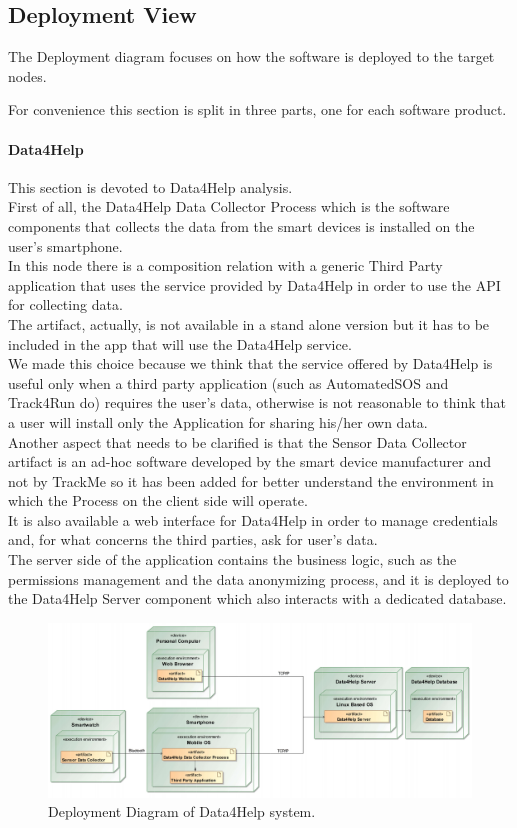 \documentclass[a4paper]{article}
\begin{document}
\subsection{Deployment View}
The Deployment diagram focuses on how the software is deployed to the target nodes.

For convenience this section is split in three parts, one for each software product.

\paragraph{Data4Help}
This section is devoted to Data4Help analysis. \\
First of all, the Data4Help Data Collector Process which is the software components that collects the data from the smart devices is installed on the user's smartphone. \\
In this node there is a composition relation with a generic Third Party application that uses the service provided by Data4Help in order to use the API for collecting data. \\
The artifact, actually, is not available in a stand alone version but it has to be included in the app that will use the Data4Help service. \\
We made this choice because we think that the service offered by Data4Help is useful only when a third party application (such as AutomatedSOS and Track4Run do) requires the user's data, otherwise is not reasonable to think that a user will install only the Application for sharing his/her own data. \\
Another aspect that needs to be clarified is that the Sensor Data Collector artifact is an ad-hoc software developed by the smart device manufacturer and not by TrackMe so it has been added for better understand the environment in which the Process on the client side will operate. \\
It is also available a web interface for Data4Help in order to manage credentials and, for what concerns the third parties, ask for user's data. \\
The server side of the application contains the business logic, such as the permissions management and the data anonymizing process, and it is deployed to the Data4Help Server component which also interacts with a dedicated database.

\begin{figure}[H]
    \centering
    \includegraphics[width=\linewidth]{deploymentDiagram-Data4Help}
    \caption{Deployment Diagram of Data4Help system.}
    \label{fig:my_label}
\end{figure}
\end{document}
